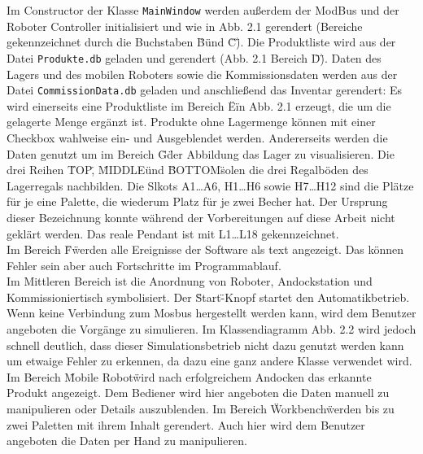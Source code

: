     Im Constructor der Klasse \verb|MainWindow| werden außerdem der ModBus und der Roboter Controller initialisiert
    und wie in Abb. 2.1 gerendert (Bereiche gekennzeichnet durch die Buchstaben \"B\" und \"C\").
    Die Produktliste wird aus der Datei \verb|Produkte.db| geladen und gerendert (Abb. 2.1 Bereich \"D\").
    Daten des Lagers und des mobilen Roboters sowie die Kommissionsdaten werden aus der Datei \verb|CommissionData.db|
    geladen und anschließend das Inventar gerendert:
    Es wird einerseits eine Produktliste im Bereich \"E\" in Abb. 2.1 erzeugt, die um die gelagerte Menge ergänzt ist.
    Produkte ohne Lagermenge können mit einer Checkbox wahlweise ein- und Ausgeblendet werden.
    Andererseits werden die Daten genutzt um im Bereich \"G\" der Abbildung das Lager zu visualisieren.
    Die drei Reihen \"TOP\", \"MIDDLE\" und \"BOTTOM\" solen die drei Regalböden des Lagerregals nachbilden.
    Die Slkots A1\ldots A6, H1\ldots H6 sowie  H7\ldots H12 sind die Plätze für je eine Palette, die wiederum Platz für
    je zwei Becher hat.
    Der Ursprung dieser Bezeichnung konnte während der Vorbereitungen auf diese Arbeit nicht geklärt werden.
    Das reale Pendant ist mit L1\ldots L18 gekennzeichnet.
    \\
    Im Bereich \"F\" werden alle Ereignisse der Software als text angezeigt.
    Das können Fehler sein aber auch Fortschritte im Programmablauf.
    \\
    Im Mittleren Bereich ist die Anordnung von Roboter, Andockstation und Kommissioniertisch symbolisiert.
    Der \"Start\"-Knopf startet den Automatikbetrieb. Wenn keine Verbindung zum Mosbus hergestellt werden kann,
    wird dem Benutzer angeboten die Vorgänge zu simulieren. Im Klassendiagramm Abb. 2.2 wird jedoch schnell deutlich,
    dass dieser Simulationsbetrieb nicht dazu genutzt werden kann um etwaige Fehler zu erkennen, da dazu eine ganz
    andere Klasse verwendet wird.
    Im Bereich \"Mobile Robot\" wird nach erfolgreichem Andocken das erkannte Produkt angezeigt.
    Dem Bediener wird hier angeboten die Daten manuell zu manipulieren oder Details auszublenden.
    Im Bereich \"Workbench\" werden bis zu zwei Paletten mit ihrem Inhalt gerendert.
    Auch hier wird dem Benutzer angeboten die Daten per Hand zu manipulieren.

